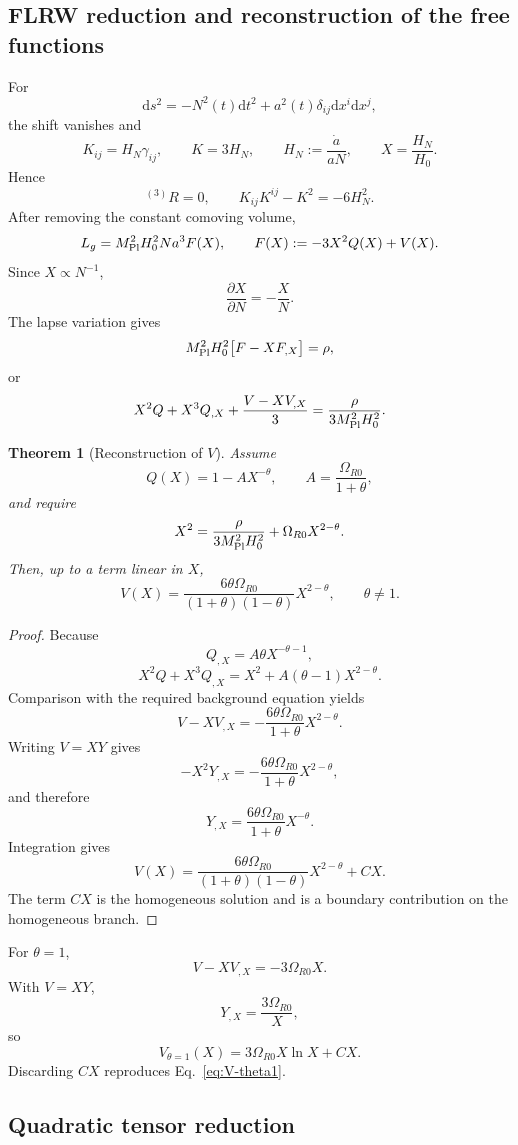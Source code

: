 \documentclass[11pt,a4paper]{article}
\newtheorem{theorem}[axiom]{Theorem}
\renewcommand{\dd}{\mathrm{d}}
\newcommand{\mpl}{M_{\rm Pl}}
\begin{document}
\subsection{FLRW reduction and reconstruction of the free functions}

For
\[
\dd s^2=-N^2(t)\dd t^2+a^2(t)\delta_{ij}\dd x^i\dd x^j,
\]
the shift vanishes and
\[
K_{ij}=H_N\gamma_{ij},\qquad K=3H_N,\qquad
H_N:=\frac{\dot a}{aN},\qquad X=\frac{H_N}{H_0}.
\]
Hence
\[
{}^{(3)}R=0,\qquad
K_{ij}K^{ij}-K^2=-6H_N^2.
\]
After removing the constant comoving volume,
\[
L_g=\mpl^2H_0^2Na^3F(X),
\qquad
F(X):=-3X^2Q(X)+V(X).
\]
Since \(X\propto N^{-1}\),
\[
\frac{\partial X}{\partial N}=-\frac{X}{N}.
\]
The lapse variation gives
\[
\mpl^2H_0^2\bigl[F-XF_{,X}\bigr]=\rho,
\]
or
\begin{equation}
X^2Q+X^3Q_{,X}+\frac{V-XV_{,X}}{3}
=
\frac{\rho}{3\mpl^2H_0^2}.
\label{eq:FLRW-constraint-general}
\end{equation}

\begin{theorem}[Reconstruction of \(V\)]
Assume
\[
Q(X)=1-A X^{-\theta},
\qquad
A=\frac{\Omega_{R0}}{1+\theta},
\]
and require
\[
X^2
=
\frac{\rho}{3\mpl^2H_0^2}
+\Omega_{R0}X^{2-\theta}.
\]
Then, up to a term linear in \(X\),
\[
V(X)=
\frac{6\theta\Omega_{R0}}
{(1+\theta)(1-\theta)}
X^{2-\theta},
\qquad \theta\neq1.
\]
\end{theorem}

\begin{proof}
Because
\[
Q_{,X}=A\theta X^{-\theta-1},
\]
\[
X^2Q+X^3Q_{,X}
=
X^2+A(\theta-1)X^{2-\theta}.
\]
Comparison with the required background equation yields
\[
V-XV_{,X}
=
-\frac{6\theta\Omega_{R0}}{1+\theta}X^{2-\theta}.
\]
Writing \(V=XY\) gives
\[
-X^2Y_{,X}
=
-\frac{6\theta\Omega_{R0}}{1+\theta}X^{2-\theta},
\]
and therefore
\[
Y_{,X}
=
\frac{6\theta\Omega_{R0}}{1+\theta}X^{-\theta}.
\]
Integration gives
\[
V(X)=
\frac{6\theta\Omega_{R0}}
{(1+\theta)(1-\theta)}
X^{2-\theta}
+CX.
\]
The term \(CX\) is the homogeneous solution and is a boundary contribution on
the homogeneous branch.
\end{proof}

For \(\theta=1\),
\[
V-XV_{,X}=-3\Omega_{R0}X.
\]
With \(V=XY\),
\[
Y_{,X}=\frac{3\Omega_{R0}}{X},
\]
so
\[
V_{\theta=1}(X)=3\Omega_{R0}X\ln X+CX.
\]
Discarding \(CX\) reproduces Eq.~\eqref{eq:V-theta1}.

\subsection{Quadratic tensor reduction}
\end{document}
